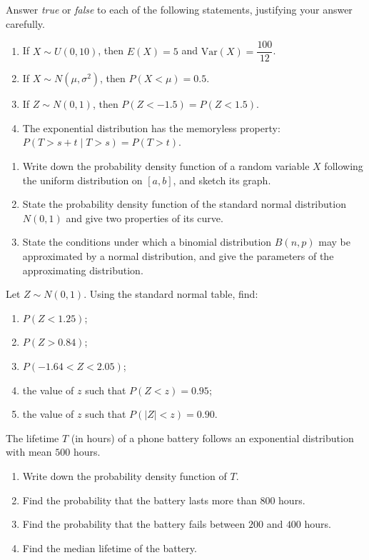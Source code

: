 \documentclass[11pt]{article}
\newcounter{popsec}
\newcounter{popsub}
\newcommand{\courssub}[1]{%
  \stepcounter{popsub}%
  \par\vspace{9pt}\noindent{\popxbold\fontsize{11.5}{13}\selectfont\color{popink}{\color{poporange}\thepopsec.\thepopsub}\hspace{6pt}#1}\par\nopagebreak\vspace{4pt}
}
\begin{document}
\begin{exercice}
Answer \emph{true} or \emph{false} to each of the following statements, justifying your answer carefully.
\begin{enumerate}
\item If $X \sim U(0, 10)$, then $E(X) = 5$ and $\mathrm{Var}(X) = \dfrac{100}{12}$.
\item If $X \sim N(\mu, \sigma^2)$, then $P(X < \mu) = 0.5$.
\item If $Z \sim N(0,1)$, then $P(Z < -1.5) = P(Z < 1.5)$.
\item The exponential distribution has the memoryless property: $P(T > s + t \mid T > s) = P(T > t)$.
\end{enumerate}
\end{exercice}

\begin{exercice}
\begin{enumerate}
\item Write down the probability density function of a random variable $X$ following the uniform distribution on $[a, b]$, and sketch its graph.
\item State the probability density function of the standard normal distribution $N(0,1)$ and give two properties of its curve.
\item State the conditions under which a binomial distribution $B(n, p)$ may be approximated by a normal distribution, and give the parameters of the approximating distribution.
\end{enumerate}
\end{exercice}

\begin{exercice}
Let $Z \sim N(0,1)$. Using the standard normal table, find:
\begin{enumerate}
\item $P(Z < 1.25)$;
\item $P(Z > 0.84)$;
\item $P(-1.64 < Z < 2.05)$;
\item the value of $z$ such that $P(Z < z) = 0.95$;
\item the value of $z$ such that $P(|Z| < z) = 0.90$.
\end{enumerate}
\end{exercice}

\courssub{I practise}

\begin{exercice}
The lifetime $T$ (in hours) of a phone battery follows an exponential distribution with mean $500$ hours.
\begin{enumerate}
\item Write down the probability density function of $T$.
\item Find the probability that the battery lasts more than $800$ hours.
\item Find the probability that the battery fails between $200$ and $400$ hours.
\item Find the median lifetime of the battery.
\end{enumerate}
\end{exercice}
\end{document}
